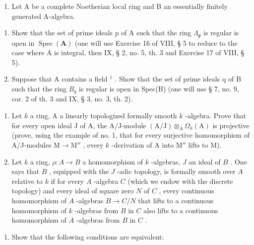 \begin{enumerate}
\def\labelenumi{\arabic{enumi})}
\setcounter{enumi}{4}
\tightlist
\item
  Let A be a complete Noetherian local ring and B an essentially finitely generated A-algebra.
\end{enumerate}

\begin{enumerate}
\def\labelenumi{\alph{enumi})}
\item
  Show that the set of prime ideals p of A such that the ring \(\Lambda_{\mathfrak{p}}\) is regular is open in \(\operatorname{Spec}(\mathbf{A})\) (one will use Exercise 16 of VIII, § 5 to reduce to the case where A is integral, then IX, § 2, no. 5, th. 3 and Exercise 17 of VIII, § 5).
\item
  Suppose that A contains a field \(^{1}\) . Show that the set of prime ideals q of B such that the ring \(B_{q}\) is regular is open in Spec(B) (one will use § 7, no. 9, cor. 2 of th. 3 and IX, § 3, no. 3, th. 2).
\end{enumerate}

\begin{enumerate}
\def\labelenumi{\arabic{enumi})}
\setcounter{enumi}{5}
\item
  Let \(k\) a ring, A a linearly topologized formally smooth \(k\) -algebra. Prove that for every open ideal J of A, the A/J-module \((\mathrm{A} / \mathrm{J}) \otimes_{\mathrm{A}} \Omega_k(\mathrm{A})\) is projective (prove, using the example of no. 1, that for every surjective homomorphism of A/J-modules \(\mathrm{M} \to \mathrm{M}''\) , every \(k\) -derivation of A into \(\mathrm{M}''\) lifts to M).
\item
  Let \(k\) a ring, \(\rho : A \to B\) a homomorphism of \(k\) -algebras, \(J\) an ideal of \(B\) . One says that \(B\) , equipped with the \(J\) -adic topology, is formally smooth over \(A\) relative to \(k\) if for every \(A\) -algebra \(C\) (which we endow with the discrete topology) and every ideal of square zero \(N\) of \(C\) , every continuous homomorphism of \(A\) -algebras \(B \to C/N\) that lifts to a continuous homomorphism of \(k\) -algebras from \(B\) in \(C\) also lifts to a continuous homomorphism of \(A\) -algebras from \(B\) in \(C\) .
\end{enumerate}

\begin{enumerate}
\def\labelenumi{\alph{enumi})}
\tightlist
\item
  Show that the following conditions are equivalent:
\end{enumerate}

